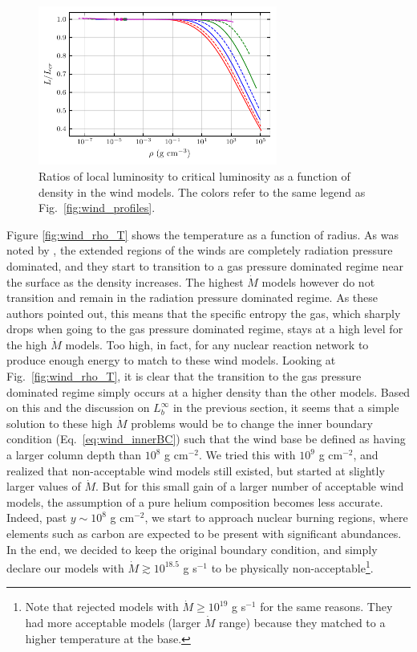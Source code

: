 \documentclass[../main.tex]{subfiles}
\newcommand{\Mdot}{\dot{M}}
\begin{document}
\begin{figure}
    \centering
    \includegraphics[width=0.7\textwidth]{figures/wind_L_Lcrit.pdf}
    \caption{Ratios of local luminosity to critical luminosity as a function of density in the wind models. The colors refer to the same legend as Fig.~\ref{fig:wind_profiles}.}
    \label{fig:wind_L_Lcrit}
\end{figure}

Figure \ref{fig:wind_rho_T} shows the temperature as a function of radius. As was noted by \citet{Paczynski1986b}, the extended regions of the winds are completely radiation pressure dominated, and they start to transition to a gas pressure dominated regime near the surface as the density increases. The highest $\Mdot$ models however do not transition and remain in the radiation pressure dominated regime. As these authors pointed out, this means that the specific entropy the gas, which sharply drops when going to the gas pressure dominated regime, stays at a high level for the high $\Mdot$ models. Too high, in fact, for any nuclear reaction network to produce enough energy to match to these wind models. Looking at Fig.~\ref{fig:wind_rho_T}, it is clear that the transition to the gas pressure dominated regime simply occurs at a higher density than the other models. Based on this and the discussion on $L
_b^\infty$ in the previous section, it seems that a simple solution to these high $\Mdot$ problems would be to change the inner boundary condition (Eq.~\ref{eq:wind_innerBC}) such that the wind base be defined as having a larger column depth than $10^8$ g cm$^{-2}$. We tried this with $10^9$ g cm$^{-2}$, and realized that non-acceptable wind models still existed, but started at slightly larger values of $\Mdot$. But for this small gain of a larger number of acceptable wind models, the assumption of a pure helium composition becomes less accurate. Indeed, past $y\sim 10
^8$ g cm$^{-2}$, we start to approach nuclear burning regions, where elements such as carbon are expected to be present with significant abundances.  In the end, we decided to keep the original boundary condition, and simply declare our models with $\Mdot\gtrsim 10^{18.5}$ g s$^{-1}$ to be physically non-acceptable\footnote{Note that \citet{Paczynski1986b} rejected models with $\Mdot\geq 10^{19}$ g s$^{-1}$ for the same reasons. They had more acceptable models (larger $\Mdot$ range) because they matched to a higher temperature at the base.}.\\
\end{document}
